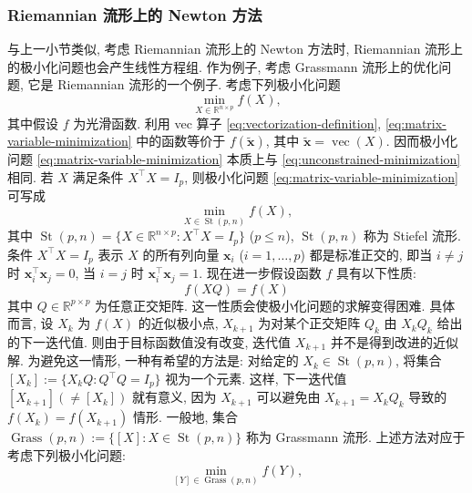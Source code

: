 \subsubsection{{Riemannian 流形上的 Newton 方法}}\label{subsec:riemannian-newton}
{与上一小节类似, 考虑 Riemannian 流形上的 Newton 方法时, Riemannian 流形上的极小化问题也会产生线性方程组. 作为例子, 考虑 Grassmann 流形上的优化问题, 它是 Riemannian 流形的一个例子. 考虑下列极小化问题}
\begin{equation}\label{eq:matrix-variable-minimization}
\min_{X\in\mathbb{R}^{n\times p}}f(X),
\end{equation}
{其中假设 $f$ 为光滑函数. 利用 vec 算子 \eqref{eq:vectorization-definition}, \eqref{eq:matrix-variable-minimization} 中的函数等价于 $f(\widetilde{\boldsymbol{x}})$, 其中 $\widetilde{\boldsymbol{x}}=\operatorname{vec}(X)$. 因而极小化问题 \eqref{eq:matrix-variable-minimization} 本质上与 \eqref{eq:unconstrained-minimization} 相同. 若 $X$ 满足条件 $X^{\top}X=I_p$, 则极小化问题 \eqref{eq:matrix-variable-minimization} 可写成}
\begin{equation}\label{eq:stiefel-minimization}
\min_{X\in\operatorname{St}(p,n)}f(X),
\end{equation}
{其中 $\operatorname{St}(p,n)=\{X\in\mathbb{R}^{n\times p}:X^{\top}X=I_p\}$ ($p\le n$), $\operatorname{St}(p,n)$ 称为 Stiefel 流形. 条件 $X^{\top}X=I_p$ 表示 $X$ 的所有列向量 $\boldsymbol{x}_i$ ($i=1,\ldots,p$) 都是标准正交的, 即当 $i\ne j$ 时 $\boldsymbol{x}_i^{\top}\boldsymbol{x}_j=0$, 当 $i=j$ 时 $\boldsymbol{x}_i^{\top}\boldsymbol{x}_j=1$. 现在进一步假设函数 $f$ 具有以下性质:}
\begin{equation}\label{eq:orthogonal-invariance}
f(XQ)=f(X)
\end{equation}
{其中 $Q\in\mathbb{R}^{p\times p}$ 为任意正交矩阵. 这一性质会使极小化问题的求解变得困难. 具体而言, 设 $X_k$ 为 $f(X)$ 的近似极小点, $X_{k+1}$ 为对某个正交矩阵 $Q_k$ 由 $X_kQ_k$ 给出的下一迭代值. 则由于目标函数值没有改变, 迭代值 $X_{k+1}$ 并不是得到改进的近似解. 为避免这一情形, 一种有希望的方法是: 对给定的 $X_k\in\operatorname{St}(p,n)$, 将集合 $[X_k]:=\{X_kQ:Q^{\top}Q=I_p\}$ 视为一个元素. 这样, 下一迭代值 $[X_{k+1}](\ne[X_k])$ 就有意义, 因为 $X_{k+1}$ 可以避免由 $X_{k+1}=X_kQ_k$ 导致的 $f(X_k)=f(X_{k+1})$ 情形.}
{一般地, 集合 $\operatorname{Grass}(p,n):=\{[X]:X\in\operatorname{St}(p,n)\}$ 称为 Grassmann 流形. 上述方法对应于考虑下列极小化问题:}
\begin{equation}\label{eq:grassmann-minimization}
\min_{[Y]\in\operatorname{Grass}(p,n)}f(Y),
\end{equation}
